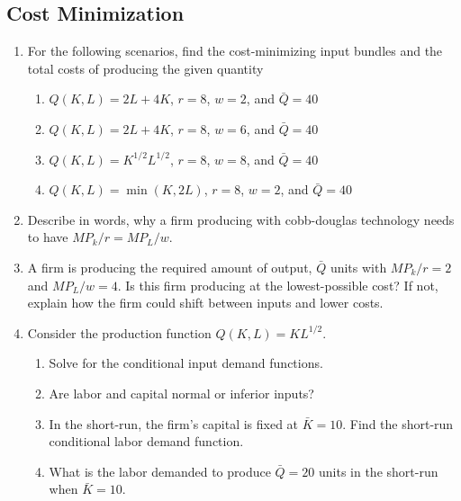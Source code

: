 \documentclass[11pt]{article}
\begin{document}
\subsection*{Cost Minimization}
\begin{enumerate}
  \item For the following scenarios, find the cost-minimizing input bundles and the total costs of producing the given quantity
  \begin{enumerate}
    \item $Q(K, L) = 2L + 4K$, $r = 8$, $w = 2$, and $\bar{Q} = 40$

    \item $Q(K, L) = 2L + 4K$, $r = 8$, $w = 6$, and $\bar{Q} = 40$

    \item $Q(K, L) = K^{1/2}L^{1/2}$, $r = 8$, $w = 8$, and $\bar{Q} = 40$ 

    \item $Q(K, L) = \min(K, 2L)$, $r = 8$, $w = 2$, and $\bar{Q} = 40$
  \end{enumerate}

  \item Describe in words, why a firm producing with cobb-douglas technology needs to have $MP_k/r = MP_L/w$.
  
  \item A firm is producing the required amount of output, $\bar{Q}$ units with $MP_k / r = 2$ and $MP_L / w = 4$. Is this firm producing at the lowest-possible cost? If not, explain how the firm could shift between inputs and lower costs.
    
  \item Consider the production function $Q(K, L) = KL^{1/2}$.
  \begin{enumerate}
    \item Solve for the conditional input demand functions. 
    
    \item Are labor and capital normal or inferior inputs?
    
    \item In the short-run, the firm's capital is fixed at $\bar{K} = 10$. Find the short-run conditional labor demand function. 
    
    \item What is the labor demanded to produce $\bar{Q} = 20$ units in the short-run when $\bar{K} = 10$.
  \end{enumerate} 
\end{enumerate}
\end{document}
